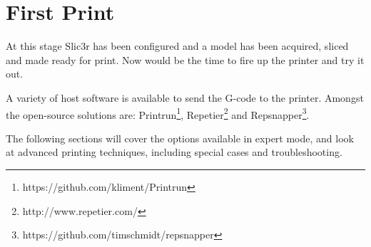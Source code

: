 
\section{First Print} %
\label{sec:first_print}

At this stage Slic3r has been configured and a model has been acquired, sliced and made ready for print.  Now would be the time to fire up the printer and try it out.

A variety of host software is available to send the G-code to the printer.  Amongst the open-source solutions are: Printrun\footnote{https://github.com/kliment/Printrun}, Repetier\footnote{http://www.repetier.com/} and Repsnapper\footnote{https://github.com/timschmidt/repsnapper}.

The following sections will cover the options available in expert mode, and look at advanced printing techniques, including special cases and troubleshooting.

